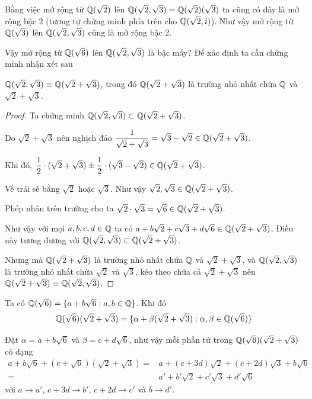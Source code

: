 Bằng việc mở rộng từ $\mathbb{Q}(\sqrt{2})$ lên $\mathbb{Q}(\sqrt{2}, \sqrt{3}) = \mathbb{Q}(\sqrt{2})(\sqrt{3})$ ta cũng có đây là mở rộng bậc 2 (tương tự chứng minh phía trên cho $\mathbb{Q}(\sqrt{2}, i)$). Như vậy mở rộng từ $\mathbb{Q}(\sqrt{3})$ lên $\mathbb{Q}(\sqrt{2}, \sqrt{3})$ cũng là mở rộng bậc 2.

Vậy mở rộng từ $\mathbb{Q}(\sqrt{6})$ lên $\mathbb{Q}(\sqrt{2}, \sqrt{3})$ là bậc mấy? Để xác định ta cần chứng minh nhận xét sau

\begin{remark}
    $\mathbb{Q}(\sqrt{2}, \sqrt{3}) \equiv \mathbb{Q}(\sqrt{2} + \sqrt{3})$, trong đó $\mathbb{Q}(\sqrt{2} + \sqrt{3})$ là trường nhỏ nhất chứa $\mathbb{Q}$ và $\sqrt{2} + \sqrt{3}$.
\end{remark}

\begin{proof}
    Ta chứng minh $\mathbb{Q}(\sqrt{2}, \sqrt{3}) \subset \mathbb{Q}(\sqrt{2} + \sqrt{3})$.

    Do $\sqrt{2} + \sqrt{3}$ nên nghịch đảo $\dfrac{1}{\sqrt{2} + \sqrt{3}} = \sqrt{3} - \sqrt{2} \in \mathbb{Q}(\sqrt{2} + \sqrt{3})$.

    Khi đó, $\dfrac{1}{2} \cdot (\sqrt{2} + \sqrt{3}) \pm \dfrac{1}{2} \cdot (\sqrt{3} - \sqrt{2}) \in \mathbb{Q}(\sqrt{2} + \sqrt{3})$.

    Vế trái sẽ bằng $\sqrt{2}$ hoặc $\sqrt{3}$. Như vậy $\sqrt{2}, \sqrt{3} \in \mathbb{Q}(\sqrt{2} + \sqrt{3})$.

    Phép nhân trên trường cho ta $\sqrt{2} \cdot \sqrt{3} = \sqrt{6} \in \mathbb{Q}(\sqrt{2} + \sqrt{3})$.

    Như vậy với mọi $a, b, c, d \in \mathbb{Q}$ ta có $a + b \sqrt{2} + c \sqrt{3} + d \sqrt{6} \in \mathbb{Q}(\sqrt{2} + \sqrt{3})$. Điều này tương đương với $\mathbb{Q}(\sqrt{2}, \sqrt{3}) \subset \mathbb{Q}(\sqrt{2} + \sqrt{3})$.

    Nhưng mà $\mathbb{Q}(\sqrt{2} + \sqrt{3})$ là trường nhỏ nhất chứa $\mathbb{Q}$ và $\sqrt{2} + \sqrt{3}$, và $\mathbb{Q}(\sqrt{2}, \sqrt{3})$ là trường nhỏ nhất chứa $\sqrt{2}$ và $\sqrt{3}$, kéo theo chứa cả $\sqrt{2} + \sqrt{3}$ nên $\mathbb{Q}(\sqrt{2} + \sqrt{3}) \equiv \mathbb{Q}(\sqrt{2}, \sqrt{3})$.
\end{proof}

Ta có $\mathbb{Q}(\sqrt{6}) = \{ a + b \sqrt{6} : a, b \in \mathbb{Q} \}$. Khi đó
\begin{equation}
    \label{QQ6_to_QQ2+3}
    \mathbb{Q}(\sqrt{6})(\sqrt{2} + \sqrt{3}) = \{ \alpha + \beta (\sqrt{2} + \sqrt{3}) : \alpha, \beta \in \mathbb{Q}(\sqrt{6}) \}
\end{equation}

Đặt $\alpha = a + b \sqrt{6}$ và $\beta = c + d \sqrt{6}$, như vậy mỗi phần tử trong $\mathbb{Q}(\sqrt{6})(\sqrt{2} + \sqrt{3})$ có dạng
\begin{align*}
    a + b \sqrt{6} + (c + \sqrt{6})(\sqrt{2} + \sqrt{3}) = & a + (c + 3d) \sqrt{2} + (c + 2d) \sqrt{3} + b \sqrt{6} \\
        = & a' + b' \sqrt{2} + c' \sqrt{3} + d' \sqrt{6}
\end{align*}
với $a \to a'$, $c+3d \to b'$, $c + 2d \to c'$ và $b \to d'$.

